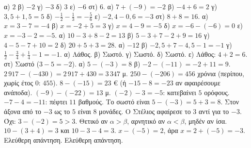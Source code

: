  α) $2$ \quad β) $-2$ \quad γ) $-3$ \quad δ) $3$ \quad ε) $-6$ \quad στ) $6$.
 α) $7+(-9)=-2$ \quad β) $-4+6=2$ \quad γ) $3{,}5+1{,}5=5$ \quad δ) $-\frac{1}{2}-\frac{1}{3}=-\frac{5}{6}$ \quad ε) $-2{,}4-0{,}6=-3$ \quad στ) $8+8=16$.
 α) $x=3-7=-4$ \quad β) $x=-2+5=3$ \quad γ) $x=4-9=-5$ \quad δ) $x=-6-(-6)=0$ \quad ε) $x=-3-2=-5$.
 α) $10-3+8-2=13$ \quad β) $5-3+7-2+9=16$ \quad γ) $4-5-7+10=2$ \quad δ) $20+5+3=28$.
 α) $-12$ \quad β) $-2{,}5+7-4{,}5-1=-1$ \quad γ) $\frac{1}{2}-\frac{3}{4}+\frac{1}{4}-1=-1$.
 α) Λάθος. β) Σωστό. γ) Σωστό. δ) Σωστό. ε) Λάθος: $4+2=6$. στ) Σωστό ($3-5=-2$).
 α) $5-(-3)=8$ \quad β) $-2-(-11)=-2+11=9$.
 $2\,917-(-430)=2\,917+430=3\,347$ μ.
 $250-(-206)=456$ χρόνια (περίπου, χωρίς έτος $0$: $455$).
 $8-(-15)=23$ € (ή $-15-8=-23$ αν αφαιρέσουμε ανάποδα).
 $(-9)-(-22)=13$ μ.
 $(-2)-3=-5$: κατεβαίνει $5$ ορόφους.
 $-7-4=-11$: πέφτει $11$ βαθμούς.
 Το σωστό είναι $5-(-3)=5+3=8$. Στον άξονα από το $-3$ ως το $5$ είναι $8$ μονάδες. Ο Στέλιος αφαίρεσε το $3$ αντί για το $-3$.
 Όχι: $3-(-2)=5>3$.
 Θετικό αν $\alpha>\beta$, αρνητικό αν $\alpha<\beta$, μηδέν αν ίσα.
 $10-(3+4)=3$ και $10-3-4=3$.
 $x-(-5)=2$, άρα $x=2+(-5)=-3$.
 Ελεύθερη απάντηση.
 Ελεύθερη απάντηση.

